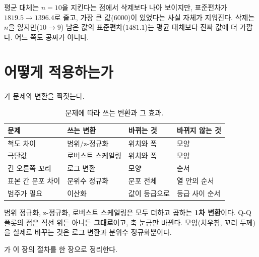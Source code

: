 \begin{pitfall}
평균 대체는 $n=10$을 지킨다는 점에서 삭제보다 나아 보이지만, 표준편차가
$1819.5 \to 1396.4$로 줄고, 가장 큰 값(6000)이 있었다는 사실 자체가
지워진다. 삭제는 $n$을 잃지만($10 \to 9$) 남은 값의 표준편차($1481.1$)는
평균 대체보다 진짜 값에 더 가깝다. 어느 쪽도 공짜가 아니다.
\end{pitfall}

\section{어떻게 적용하는가}
\label{sec:qq-apply}

가 문제와 변환을 짝짓는다.

\begin{table}[H]\centering
\begin{tabularx}{\linewidth}{@{}l X X X@{}}
\toprule
문제 & 쓰는 변환 & 바뀌는 것 & 바뀌지 않는 것 \\
\midrule
척도 차이 & 범위/z-정규화 & 위치와 폭 & 모양 \\
\midrule
극단값 & 로버스트 스케일링 & 위치와 폭 & 모양 \\
\midrule
긴 오른쪽 꼬리 & 로그 변환 & 모양 & 순서 \\
\midrule
표본 간 분포 차이 & 분위수 정규화 & 분포 전체 & 열 안의 순서 \\
\midrule
범주가 필요 & 이산화 & 값이 등급으로 & 등급 사이 순서 \\
\bottomrule
\end{tabularx}
\caption{문제에 따라 쓰는 변환과 그 효과.}
\label{tab:qq-transforms}
\end{table}

\begin{keyidea}
범위 정규화, z-정규화, 로버스트 스케일링은 모두 더하고 곱하는 \textbf{1차
변환}이다. Q-Q 플롯의 점은 직선 위든 아니든 \textbf{그대로}이고, 축
눈금만 바뀐다. 모양(치우침, 꼬리 두께)을 실제로 바꾸는 것은 로그
변환과 분위수 정규화뿐이다.
\end{keyidea}

가 이 장의 절차를 한 장으로 정리한다.

